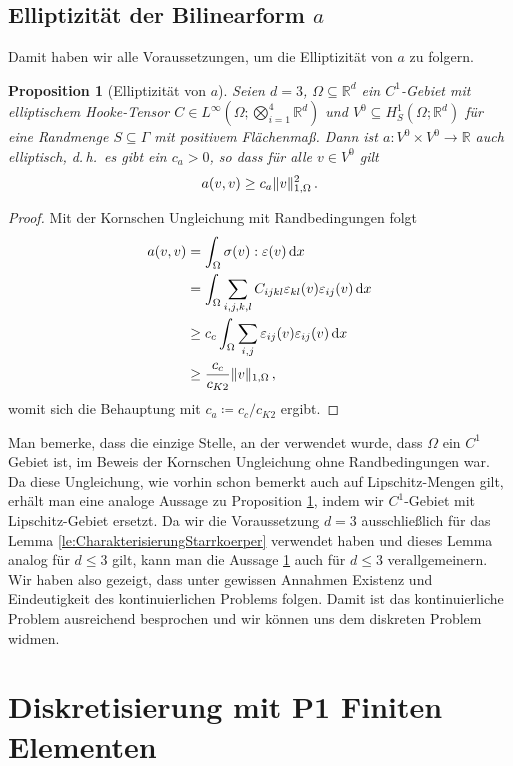 \documentclass{scrartcl}
\newcounter{everything}
\newtheorem{proposition}[everything]{Proposition}
\def\R{\mathbb{R}}
\def\e{\varepsilon}
\newcommand{\dif}[1]{\,\mathrm{d} #1}
\DeclarePairedDelimiter{\norm}{\lVert}{\rVert}
\begin{document}
\subsection{Elliptizität der Bilinearform $a$}
Damit haben wir alle Voraussetzungen, um die Elliptizität von $a$ zu folgern.
\begin{proposition}[Elliptizität von $a$]\label{pr:elliptizitaeta}
	Seien $d=3$, $\Omega\subseteq\R^d$ ein $C^1$-Gebiet mit elliptischem Hooke-Tensor $C\in L^\infty(\Omega;\bigotimes_{i=1}^4\R^d)$ und $V^0\subseteq H^1_S(\Omega;\R^d)$ für eine Randmenge $S\subseteq\Gamma$ mit positivem Flächenmaß. Dann ist $a\colon V^0\times V^0\to \R$ auch elliptisch, d.\,h.\ es gibt ein $c_a>0$, so dass für alle $v\in V^0$ gilt
	\begin{align*}
		a(v,v)\geq c_a\norm{v}^2_{1,\Omega}\,.
	\end{align*}
\end{proposition}
\begin{proof}
	Mit der Kornschen Ungleichung mit Randbedingungen folgt
	\begin{align*}
		a(v,v)&=\int_\Omega\sigma(v):\e(v)\dif x \\
		&= \int_\Omega\sum_{i,j,k,l}C_{ijkl}\e_{kl}(v)\e_{ij}(v)\dif x \\
		&\geq c_c\int_\Omega\sum_{i,j}\e_{ij}(v)\e_{ij}(v)\dif x \\
		&\geq \frac{c_c}{c_{K2}}\norm{v}_{1,\Omega}\,,
	\end{align*}
	womit sich die Behauptung mit $c_a\coloneqq c_c/c_{K2}$ ergibt.
\end{proof}
Man bemerke, dass die einzige Stelle, an der verwendet wurde, dass $\Omega$ ein $C^1$ Gebiet ist, im Beweis der Kornschen Ungleichung ohne Randbedingungen war. Da diese Ungleichung, wie vorhin schon bemerkt auch auf Lipschitz-Mengen gilt, erhält man eine analoge Aussage zu Proposition \ref{pr:elliptizitaeta}, indem wir $C^1$-Gebiet mit Lipschitz-Gebiet ersetzt. Da wir die Voraussetzung $d=3$ ausschließlich für das Lemma \ref{le:CharakterisierungStarrkoerper} verwendet haben und dieses Lemma analog für $d\leq3$ gilt, kann man die Aussage \ref{pr:elliptizitaeta} auch für $d\leq3$ verallgemeinern.
Wir haben also gezeigt, dass unter gewissen Annahmen Existenz und Eindeutigkeit des kontinuierlichen Problems folgen. Damit ist das kontinuierliche Problem ausreichend besprochen und wir können uns dem diskreten Problem widmen.

\newpage

\section{Diskretisierung mit P1 Finiten Elementen}
\label{ch:DiskretisierungP1FiniteElemente}
\end{document}

